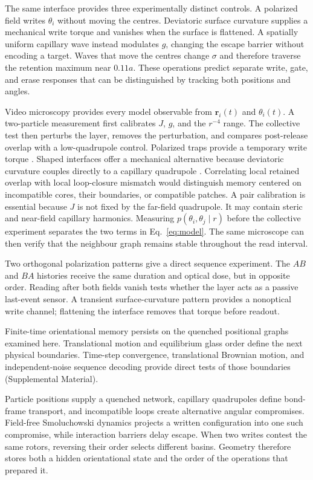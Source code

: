 \documentclass[aps,prl,reprint,superscriptaddress,nofootinbib,floatfix]{revtex4-2}
\begin{document}
The same interface provides three experimentally distinct controls. A
polarized field writes \(\theta_i\) without moving the centres. Deviatoric
surface curvature supplies a mechanical write torque and vanishes when the
surface is flattened. A spatially uniform capillary wave instead modulates
\(g\), changing the escape barrier without encoding a target. Waves that move
the centres change \(\sigma\) and therefore traverse the retention maximum
near \(0.11a\). These operations predict separate write, gate, and erase
responses that can be distinguished by tracking both positions and angles.

Video microscopy provides every model observable from \(\bm r_i(t)\) and
\(\theta_i(t)\). A two-particle measurement first calibrates \(J\), \(g\),
and the \(r^{-4}\) range. The collective test then perturbs the layer,
removes the perturbation, and compares post-release overlap with a
low-quadrupole control. Polarized traps provide a temporary write torque
\cite{lapointe2011}. Shaped interfaces offer a mechanical alternative because
deviatoric curvature couples directly to a capillary quadrupole
\cite{cavallaro2011}. Correlating local retained overlap with local loop-closure
mismatch would distinguish memory centered on incompatible cores, their
boundaries, or compatible patches.
A pair calibration is essential because \(J\) is not fixed by the far-field
quadrupole. It may contain steric and near-field capillary harmonics. Measuring
\(p(\theta_i,\theta_j\mid r)\) before the collective experiment separates the
two terms in Eq.~\eqref{eq:model}. The same microscope can then verify that
the neighbour graph remains stable throughout the read interval.

Two orthogonal polarization patterns give a direct sequence experiment. The
\(AB\) and \(BA\) histories receive the same duration and optical dose, but in
opposite order. Reading after both fields vanish tests whether the layer acts
as a passive last-event sensor. A transient surface-curvature pattern provides
a nonoptical write channel; flattening the interface removes that torque
before readout.

Finite-time orientational memory persists on the quenched positional graphs
examined here. Translational motion and equilibrium glass order define the
next physical boundaries. Time-step convergence, translational Brownian
motion, and independent-noise sequence decoding provide direct tests of those
boundaries (Supplemental Material).

Particle positions supply a quenched network, capillary quadrupoles define
bond-frame transport, and incompatible loops create alternative angular
compromises. Field-free Smoluchowski dynamics projects a written configuration
into one such compromise, while interaction barriers delay escape. When two
writes contest the same rotors, reversing their order selects different
basins. Geometry therefore stores both a hidden orientational state and the
order of the operations that prepared it.
\end{document}
